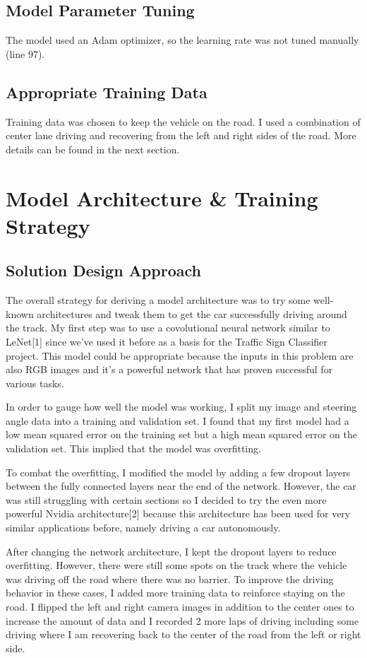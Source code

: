 \documentclass[12pt]{article}
\begin{document}
\subsection{Model Parameter Tuning}
The model used an Adam optimizer, so the learning rate was not tuned manually (line 97). 
\subsection{Appropriate Training Data}
Training data was chosen to keep the vehicle on the road. I used a combination of center lane driving and recovering from the left and right sides of the road. More details can be found in the next section.

\section{Model Architecture \& Training Strategy}
\subsection{Solution Design Approach}
The overall strategy for deriving a model architecture was to try some well-known architectures and tweak them to get the car successfully driving around the track. My first step was to use a covolutional neural network similar to LeNet[1] since we've used it before as a basis for the Traffic Sign Classifier project. This model could be appropriate because the inputs in this problem are also RGB images and it's a powerful network that has proven successful for various tasks.

In order to gauge how well the model was working, I split my image and steering angle data into a training and validation set. I found that my first model had a low mean squared error on the training set but a high mean squared error on the validation set. This implied that the model was overfitting.

To combat the overfitting, I modified the model by adding a few dropout layers between the fully connected layers near the end of the network. However, the car was still struggling with certain sections so I decided to try the even more powerful Nvidia architecture[2] because this architecture has been used for very similar applications before, namely driving a car autonomously.

After changing the network architecture, I kept the dropout layers to reduce overfitting. However, there were still some spots on the track where the vehicle was driving off the road where there was no barrier. To improve the driving behavior in these cases, I added more training data to reinforce staying on the road. I flipped the left and right camera images in addition to the center ones to increase the amount of data and I recorded 2 more laps of driving including some driving where I am recovering back to the center of the road from the left or right side.
\end{document}
